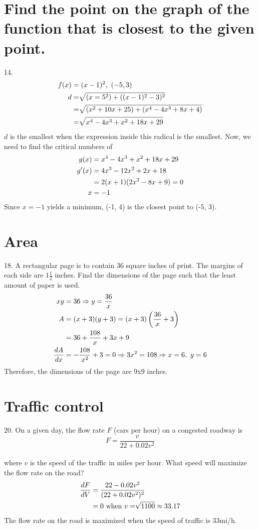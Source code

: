 \documentclass[11pt]{article}
\newcommand*{\set}{\setcounter{equation}{0}}
\begin{document}
\section{Find the point on the graph of the function that is closest to the given point.}
14.\begin{align}
    \set
    f(x)&=(x-1)^2,\,\,(-5, 3)\\
    d&=\sqrt[]{(x=5^2)+((x-1)^2-3)^2}\\
    &=\sqrt[]{(x^2+10x+25)+(x^4-4x^3+8x+4)}\\
    &=\sqrt[]{x^4-4x^3+x^2+18x+29}
\end{align}
$d$ is the smallest when the expression inside this radical is the smallest. Now, we need to find the critical numbers of
\begin{align}
    \set
    g(x)&=x^4-4x^3+x^2+18x+29\\
    g'(x)&=4x^3-12x^2+2x+18\\
    &=2(x+1)(2x^2-8x+9)=0\\
    x&=-1
\end{align}
Since $x=-1$ yields a minimum, (-1, 4) is the closest point to (-5, 3).

\section{Area}
18. A rectangular page is to contain 36 square inches of print. The margins of each side are $1\frac{1}{2}$ inches. Find the dimensions of the page such that the least amount of paper is used.
\begin{align}
    \set
    xy&=36\Rightarrow y=\frac{36}{x}\\
    A&=(x+3)(y+3)=(x+3)\left(\frac{36}{x}+3\right)\\
    &=36+\frac{108}{x}+3x+9\\
    \frac{dA}{dx}&=-\frac{108}{x^2}+3=0\Rightarrow 3x^2=108\Rightarrow x=6,\,\, y=6
\end{align}
Therefore, the dimensions of the page are 9x9 inches.

\section{Traffic control}
20. On a given day, the flow rate $F$ (cars per hour) on a congested roadway is \[F=\frac{v}{22+0.02v^2}\]\\
where $v$ is the speed of the traffic in miles per hour. What speed will maximize the flow rate on the road?
\begin{align}
    \set
    \frac{dF}{dV}&=\frac{22-0.02v^2}{(22+0.02v^2)^2}\\
    &=0\,\,\text{when}\,\, v=\sqrt[]{1100}\approx 33.17
\end{align}
The flow rate on the road is maximized when the speed of traffic is 33mi/h.
\end{document}
